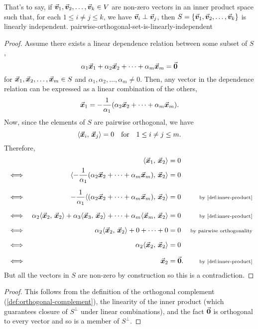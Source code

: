 \documentclass[../MathsNotesBase.tex]{subfiles}
\begin{document}
{{			That's to say, if ${ \vec{\bm{v}}_1, \vec{\bm{v}}_2, \dots, \vec{\bm{v}}_k \in V }$ are non-zero vectors in an inner product space such that, for each ${ 1 \leq i \neq j \leq k }$, we have ${ \vec{\bm{v}}_i \perp \vec{\bm{v}}_j }$, then ${ S = \{ \vec{\bm{v}}_1, \vec{\bm{v}}_2, \dots, \vec{\bm{v}}_k \} }$ is linearly independent.
		}{pairwise-orthogonal-set-is-linearly-independent}
		\begin{proof}
			Assume there exists a linear dependence relation between some subset of $S$,
			\[ \alpha_1 \vec{\bm{x}}_1 + \alpha_2 \vec{\bm{x}}_2 + \cdots + \alpha_m \vec{\bm{x}}_m = \vec{\bm{0}} \]
			for ${ \vec{\bm{x}}_1,\vec{\bm{x}}_2,\dots,\vec{\bm{x}}_m \in S }$ and ${ \alpha_1,\alpha_2,\dots,\alpha_m \neq 0 }$. Then, any vector in the dependence relation can be expressed as a linear combination of the others,
			\[ \vec{\bm{x}}_1 = -\frac{1}{\alpha_1}(\alpha_2 \vec{\bm{x}}_2 + \cdots + \alpha_m \vec{\bm{x}}_m). \]
			Now, since the elements of $S$ are pairwise orthogonal, we have
			\[ \langle \vec{\bm{x}}_i,\, \vec{\bm{x}}_j \rangle = 0 \hspace{10pt}\text{for}\hspace{10pt} 1 \leq i \neq j \leq m. \]
			Therefore,
			\[\begin{aligned}
				&& \inner{\x_1}{\x_2} &= 0 \\
				&\iff & \inner{-\frac{1}{\alpha_1}(\alpha_2 \x_2 + \cdots + \alpha_m \x_m)}{\x_2} &= 0 &\sidecomment{} \nn
				&\iff & -\frac{1}{\alpha_1}\inner{(\alpha_2 \x_2 + \cdots + \alpha_m \x_m)}{\x_2} &= 0 &\sidecomment{by \ref{def:inner-product}} \nn
				&\iff & \alpha_2\inner{\x_2}{\x_2} + \alpha_3\inner{\x_3}{\x_2} + \cdots + \alpha_m\inner{\x_m}{\x_2} &= 0 &\sidecomment{by \ref{def:inner-product}} \nn
				&\iff & \alpha_2\inner{\x_2}{\x_2} + 0 + \cdots + 0 &= 0 &\sidecomment{by pairwise orthogonality} \nn
				&\iff & \alpha_2\inner{\x_2}{\x_2} &= 0 \nn
				&\iff & \x_2 &= \0. &\sidecomment{by \ref{def:inner-product}}
			\end{aligned}\]
			But all the vectors in $S$ are non-zero by construction so this is a contradiction.
		\end{proof}	
	
		
		
		
		
		\bigskip
		\begin{proof}
			This follows from the definition of the orthogonal complement (\ref{def:orthogonal-complement}), the linearity of the inner product (which guarantees closure of $S^\perp$ under linear combinations), and the fact $\vec{\bm{0}}$ is orthogonal to every vector and so is a member of $S^\perp$.
		\end{proof}
	
}
\end{document}
